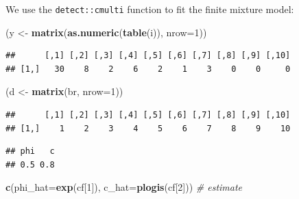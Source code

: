 \documentclass[12pt,]{book}
\newenvironment{Shaded}{\begin{snugshade}}{\end{snugshade}}
\newcommand{\CommentTok}[1]{\textcolor[rgb]{0.56,0.35,0.01}{\textit{#1}}}
\newcommand{\DataTypeTok}[1]{\textcolor[rgb]{0.13,0.29,0.53}{#1}}
\newcommand{\DecValTok}[1]{\textcolor[rgb]{0.00,0.00,0.81}{#1}}
\newcommand{\KeywordTok}[1]{\textcolor[rgb]{0.13,0.29,0.53}{\textbf{#1}}}
\newcommand{\NormalTok}[1]{#1}
\newcommand{\OperatorTok}[1]{\textcolor[rgb]{0.81,0.36,0.00}{\textbf{#1}}}
\newcommand{\StringTok}[1]{\textcolor[rgb]{0.31,0.60,0.02}{#1}}
\begin{document}
We use the \texttt{detect::cmulti} function to fit the finite mixture model:

\begin{Shaded}
\begin{Highlighting}[]
\NormalTok{(y <-}\StringTok{ }\KeywordTok{matrix}\NormalTok{(}\KeywordTok{as.numeric}\NormalTok{(}\KeywordTok{table}\NormalTok{(i)), }\DataTypeTok{nrow=}\DecValTok{1}\NormalTok{))}
\end{Highlighting}
\end{Shaded}

\begin{verbatim}
##      [,1] [,2] [,3] [,4] [,5] [,6] [,7] [,8] [,9] [,10]
## [1,]   30    8    2    6    2    1    3    0    0     0
\end{verbatim}

\begin{Shaded}
\begin{Highlighting}[]
\NormalTok{(d <-}\StringTok{ }\KeywordTok{matrix}\NormalTok{(br, }\DataTypeTok{nrow=}\DecValTok{1}\NormalTok{))}
\end{Highlighting}
\end{Shaded}

\begin{verbatim}
##      [,1] [,2] [,3] [,4] [,5] [,6] [,7] [,8] [,9] [,10]
## [1,]    1    2    3    4    5    6    7    8    9    10
\end{verbatim}

\begin{Shaded}
\end{Shaded}

\begin{verbatim}
## phi   c 
## 0.5 0.8
\end{verbatim}

\begin{Shaded}
\begin{Highlighting}[]
\KeywordTok{c}\NormalTok{(}\DataTypeTok{phi_hat=}\KeywordTok{exp}\NormalTok{(cf[}\DecValTok{1}\NormalTok{]), }\DataTypeTok{c_hat=}\KeywordTok{plogis}\NormalTok{(cf[}\DecValTok{2}\NormalTok{])) }\CommentTok{# estimate}
\end{Highlighting}
\end{Shaded}
\end{document}

